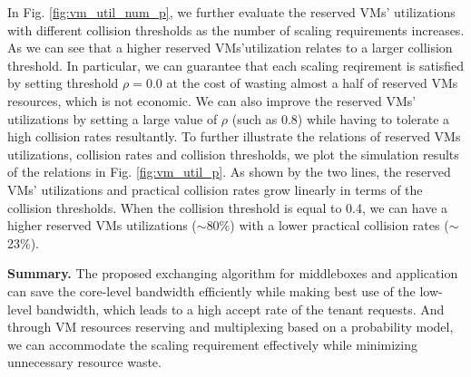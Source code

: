 \documentclass[review]{elsarticle}
\begin{document}
In Fig. \ref{fig:vm_util_num_p}, we further evaluate the reserved VMs' utilizations with different collision thresholds as the number of scaling requirements increases. As we can see that a higher reserved VMs'utilization relates to a larger collision threshold. In particular, we can guarantee that each scaling reqirement is satisfied by setting threshold $\rho=0.0$ at the cost of wasting almost a half of reserved VMs resources, which is not economic. We can also improve the reserved VMs' utilizations by setting a large value of $\rho$ (such as 0.8) while having to tolerate a high collision rates resultantly. To further illustrate the relations of reserved VMs utilizations, collision rates and collision thresholds, we plot the simulation results of the relations in Fig. \ref{fig:vm_util_p}.
As shown by the two lines, the reserved VMs' utilizations and practical collision rates grow linearly in terms of the collision thresholds. When the collision threshold is equal to 0.4, we can have a higher reserved VMs utilizations ($\sim$80\%) with a lower practical collision rates ($\sim$23\%). 

\textbf{Summary.}
The proposed exchanging algorithm for middleboxes and application can save the core-level bandwidth efficiently while making best use of the low-level bandwidth, which leads to a high accept rate of the tenant requests. And through VM resources reserving and multiplexing based on a probability model, we can accommodate the scaling requirement effectively while minimizing unnecessary resource waste.  
\end{document}

